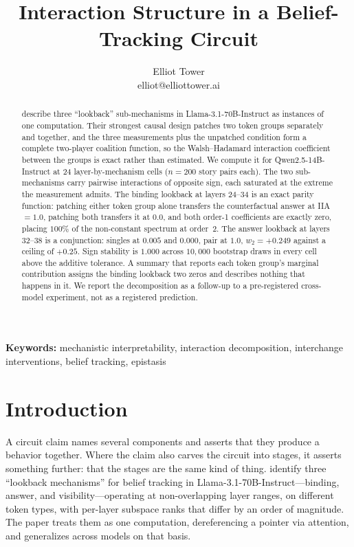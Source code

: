 \documentclass{article}
\title{Interaction Structure in a Belief-Tracking Circuit}
\author{\name Elliot Tower \\
      \email elliot@elliottower.ai}
\begin{document}
\maketitle

\begin{abstract}
\citet{prakash2025lookback} describe three ``lookback'' sub-mechanisms in Llama-3.1-70B-Instruct as instances of one computation. Their strongest causal design patches two token groups separately and together, and the three measurements plus the unpatched condition form a complete two-player coalition function, so the Walsh--Hadamard interaction coefficient between the groups is exact rather than estimated. We compute it for Qwen2.5-14B-Instruct at 24 layer-by-mechanism cells ($n = 200$ story pairs each). The two sub-mechanisms carry pairwise interactions of opposite sign, each saturated at the extreme the measurement admits. The binding lookback at layers 24--34 is an exact parity function: patching either token group alone transfers the counterfactual answer at IIA $= 1.0$, patching both transfers it at $0.0$, and both order-1 coefficients are exactly zero, placing $100\%$ of the non-constant spectrum at order~2. The answer lookback at layers 32--38 is a conjunction: singles at $0.005$ and $0.000$, pair at $1.0$, $w_2 = +0.249$ against a ceiling of $+0.25$. Sign stability is $1.000$ across $10{,}000$ bootstrap draws in every cell above the additive tolerance. A summary that reports each token group's marginal contribution assigns the binding lookback two zeros and describes nothing that happens in it. We report the decomposition as a follow-up to a pre-registered cross-model experiment, not as a registered prediction.
\end{abstract}

\noindent\textbf{Keywords:} mechanistic interpretability, interaction decomposition, interchange interventions, belief tracking, epistasis


\section{Introduction}

A circuit claim names several components and asserts that they produce a behavior together. Where the claim also carves the circuit into stages, it asserts something further: that the stages are the same kind of thing. \citet{prakash2025lookback} identify three ``lookback mechanisms'' for belief tracking in Llama-3.1-70B-Instruct---binding, answer, and visibility---operating at non-overlapping layer ranges, on different token types, with per-layer subspace ranks that differ by an order of magnitude. The paper treats them as one computation, dereferencing a pointer via attention, and generalizes across models on that basis.
\end{document}
